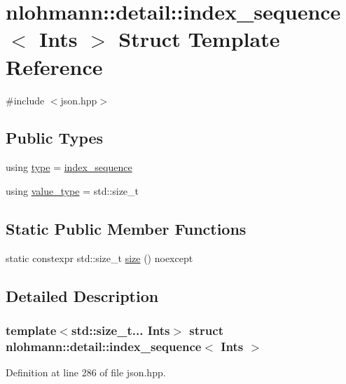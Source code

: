 \hypertarget{structnlohmann_1_1detail_1_1index__sequence}{}\section{nlohmann\+:\+:detail\+:\+:index\+\_\+sequence$<$ Ints $>$ Struct Template Reference}
\label{structnlohmann_1_1detail_1_1index__sequence}


{\ttfamily \#include $<$json.\+hpp$>$}

\subsection*{Public Types}
\begin{DoxyCompactItemize}
\item 
using \hyperlink{structnlohmann_1_1detail_1_1index__sequence_a3c14c4ab277de72b166806193ff4fa10}{type} = \hyperlink{structnlohmann_1_1detail_1_1index__sequence}{index\+\_\+sequence}
\item 
using \hyperlink{structnlohmann_1_1detail_1_1index__sequence_a2eca43d08fc1eb68bd5fa75b6714d21d}{value\+\_\+type} = std\+::size\+\_\+t
\end{DoxyCompactItemize}
\subsection*{Static Public Member Functions}
\begin{DoxyCompactItemize}
\item 
static constexpr std\+::size\+\_\+t \hyperlink{structnlohmann_1_1detail_1_1index__sequence_a7ac529419787d775f52408135304b337}{size} () noexcept
\end{DoxyCompactItemize}


\subsection{Detailed Description}
\subsubsection*{template$<$std\+::size\+\_\+t... Ints$>$\newline
struct nlohmann\+::detail\+::index\+\_\+sequence$<$ Ints $>$}



Definition at line 286 of file json.\+hpp.



